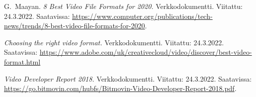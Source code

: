 \documentclass[finnish, 12pt, a4paper, elec, utf8, a-1b, online]{aaltothesis}
\begin{document}
\begin{thebibliography}{99}
    G.\ Maayan.
    \textit{8 Best Video File Formats for 2020.}
    Verkkodokumentti.
    Viitattu: 24.3.2022.
    Saatavissa: \url{https://www.computer.org/publications/tech-news/trends/8-best-video-file-formats-for-2020}.

    \textit{Choosing the right video format.}
    Verkkodokumentti.
    Viitattu: 24.3.2022.
    Saatavissa: \url{https://www.adobe.com/uk/creativecloud/video/discover/best-video-format.html}

    \textit{Video Developer Report 2018.}
    Verkkodokumentti.
    Viitattu: 24.3.2022.
    Saatavissa: \url{https://go.bitmovin.com/hubfs/Bitmovin-Video-Developer-Report-2018.pdf}.


\end{thebibliography}
\end{document}
